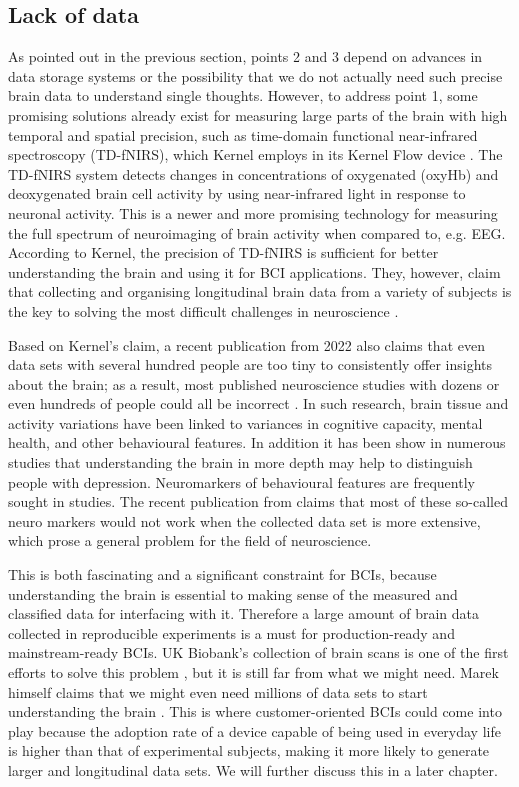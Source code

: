 \subsection{Lack of data}
\label{chapter2-lack-of-data}

As pointed out in the previous section, points 2 and 3 depend on advances in data storage systems or the possibility that we do not actually need such precise brain data to understand single thoughts. However, to address point 1, some promising solutions already exist for measuring large parts of the brain with high temporal and spatial precision, such as time-domain functional near-infrared spectroscopy (TD-fNIRS), which Kernel employs in its Kernel Flow device \citep{ban_kernel_2021}. The TD-fNIRS system detects changes in concentrations of oxygenated (oxyHb) and deoxygenated brain cell activity by using near-infrared light in response to neuronal activity. This is a newer and more promising technology for measuring the full spectrum of neuroimaging of brain activity when compared to, e.g. EEG. According to Kernel, the precision of TD-fNIRS is sufficient for better understanding the brain and using it for BCI applications. They, however, claim that collecting and organising longitudinal brain data from a variety of subjects is the key to solving the most difficult challenges in neuroscience \citep{kernel_hello-humanitypdf_nodate}.

Based on Kernel's claim, a recent publication from 2022 also claims that even data sets with several hundred people are too tiny to consistently offer insights about the brain; as a result, most published neuroscience studies with dozens or even hundreds of people could all be incorrect \citep{marek_reproducible_2022}. In such research, brain tissue and activity variations have been linked to variances in cognitive capacity, mental health, and other behavioural features. In addition it has been show in numerous studies that understanding the brain in more depth may help to distinguish people with depression. Neuromarkers of behavioural features are frequently sought in studies. The recent publication from \citeauthor{marek_reproducible_2022} claims that most of these so-called neuro markers would not work when the collected data set is more extensive, which prose a general problem for the field of neuroscience.

This is both fascinating and a significant constraint for BCIs, because understanding the brain is essential to making sense of the measured and classified data for interfacing with it. Therefore a large amount of brain data collected in reproducible experiments is a must for production-ready and mainstream-ready BCIs. UK Biobank's collection of brain scans is one of the first efforts to solve this problem \citep{noauthor_imaging_nodate}, but it is still far from what we might need. Marek himself claims that we might even need millions of data sets to start understanding the brain \citep{callaway_can_2022}. This is where customer-oriented BCIs could come into play because the adoption rate of a device capable of being used in everyday life is higher than that of experimental subjects, making it more likely to generate larger and longitudinal data sets. We will further discuss this in a later chapter.

